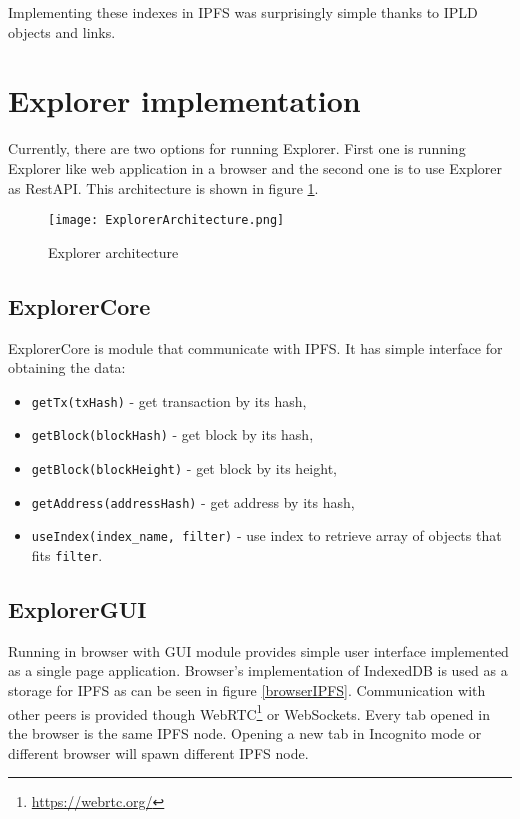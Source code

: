 Implementing these indexes in IPFS was surprisingly simple thanks to IPLD objects and links.


\section{Explorer implementation}
Currently, there are two options for running Explorer. First one is running Explorer like web application in a browser and the second one is to use Explorer as RestAPI. This architecture is shown in figure \ref{ExplorerArchitecture}.

\begin{figure}[h]
    \centering
    \texttt{[image: ExplorerArchitecture.png]}
    \caption{Explorer architecture}
    \label{ExplorerArchitecture}
\end{figure}

\subsection{ExplorerCore}
ExplorerCore is module that communicate with IPFS. It has simple interface for obtaining the data:
\begin{itemize}
    \item \texttt{getTx(txHash)} - get transaction by its hash,
    \item \texttt{getBlock(blockHash)} - get block by its hash,
    \item \texttt{getBlock(blockHeight)} - get block by its height,
    \item \texttt{getAddress(addressHash)} - get address by its hash,
    \item \texttt{useIndex(index\_name, filter)} - use index to retrieve array of objects that fits \texttt{filter}.
\end{itemize}

\subsection{ExplorerGUI}
Running in browser with GUI module provides simple user interface implemented as a single page application. Browser's implementation of IndexedDB is used as a storage for IPFS as can be seen in figure \ref{browserIPFS}. Communication with other peers is provided though WebRTC\footnote{\url{https://webrtc.org/}} or WebSockets. Every tab opened in the browser is the same IPFS node. Opening a new tab in Incognito mode or different browser will spawn different IPFS node.

